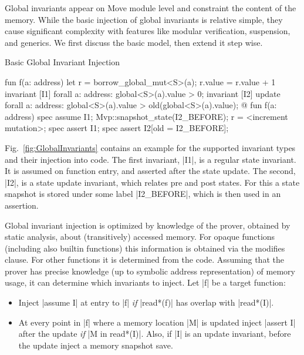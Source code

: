 \label{sec:GlobalInvariants}

Global invariants appear on Move module level and constraint the content of the
memory. While the basic injection of global invariants is relative simple, they
cause significant complexity with features like modular verification, suspension,
and generics. We first discuss the basic model, then extend it step wise.


\begin{Figure}
  \caption{Basic Global Invariant Injection}
  \label{fig:GlobalInvariants}
  \centering
\begin{MoveBox}
  fun f(a: address) {
    let r = borrow_global_mut<S>(a);
    r.value = r.value + 1
  }
  invariant [I1] forall a: address: global<S>(a).value > 0;
  invariant [I2] update
      forall a: address: global<S>(a).value > old(global<S>(a).value);
  @\transform@
  fun f(a: address) {
    spec assume I1;
    Mvp::snapshot_state(I2_BEFORE);
    r = <increment mutation>;
    spec assert I1;
    spec assert I2[old = I2_BEFORE];
  }
\end{MoveBox}
\end{Figure}

Fig.~\ref{fig:GlobalInvariants} contains an example for the supported invariant
types and their injection into code. The first invariant, |I1|, is a regular
state invariant. It is assumed on function entry, and asserted after the state
update. The second, |I2|, is a state update invariant, which relates pre and
post states. For this a state snapshot is stored under some label |I2_BEFORE|,
which is then used in an assertion.

Global invariant injection is optimized by knowledge of the prover, obtained
by static analysis, about (transitively) accessed memory. For opaque functions
(including also builtin functions) this information is obtained via the modifies
clause. For other functions it is determined from the code.  Assuming that the
prover has precise knowledge (up to symbolic address representation) of memory
usage, it can determine which invariants to inject. Let |f| be a target function:

\begin{itemize}
\item Inject |assume I| at entry to |f| \emph{if} |read*(f)| has overlap with
  |read*(I)|.
\item At every point in |f| where a memory location |M| is updated inject
  |assert I| after the update \emph{if} |M in read*(I)|. Also, if |I| is an
  update invariant, before the update inject a memory snapshot save.
\end{itemize}

